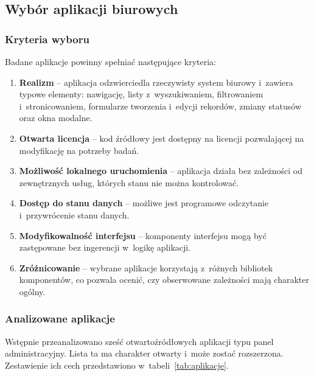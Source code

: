 \subsection{Wybór aplikacji biurowych}
\label{sec:aplikacje}
\subsubsection{Kryteria wyboru}
Badane aplikacje powinny spełniać następujące kryteria:
\begin{enumerate}
    \item \textbf{Realizm} -- aplikacja odzwierciedla rzeczywisty system biurowy i~zawiera typowe elementy: nawigację, listy z~wyszukiwaniem, filtrowaniem i~stronicowaniem, formularze tworzenia i~edycji rekordów, zmiany statusów oraz okna modalne.
    \item \textbf{Otwarta licencja} -- kod źródłowy jest dostępny na licencji pozwalającej na modyfikację na potrzeby badań.
    \item \textbf{Możliwość lokalnego uruchomienia} -- aplikacja działa bez zależności od zewnętrznych usług, których stanu nie można kontrolować.
    \item \textbf{Dostęp do stanu danych} -- możliwe jest programowe odczytanie i~przywrócenie stanu danych.
    \item \textbf{Modyfikowalność interfejsu} -- komponenty interfejsu mogą być zastępowane bez ingerencji w~logikę aplikacji.
    \item \textbf{Zróżnicowanie} -- wybrane aplikacje korzystają z~różnych bibliotek komponentów, co pozwala ocenić, czy obserwowane zależności mają charakter ogólny.
\end{enumerate}

\subsubsection{Analizowane aplikacje}
Wstępnie przeanalizowano sześć otwartoźródłowych aplikacji typu panel administracyjny. Lista ta ma charakter otwarty i~może zostać rozszerzona. Zestawienie ich cech przedstawiono w~tabeli~\ref{tab:aplikacje}.

